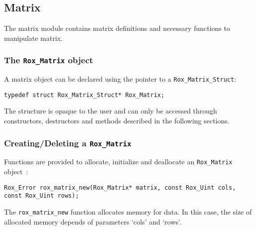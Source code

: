 \subsection{Matrix}
\label{sse:matrix}

The matrix module contains matrix definitions and necessary functions to manipulate matrix.

\subsubsection{The {\tt Rox\_Matrix} object}
\label{sss:matrix_object}

A matrix object can be declared using the pointer to a \lstinline$Rox_Matrix_Struct$: 

\begin{lstlisting}
typedef struct Rox_Matrix_Struct* Rox_Matrix;
\end{lstlisting}

The structure is opaque to the user and can only be accessed through constructors, destructors and methods described in the following sections.

\subsubsection{Creating/Deleting a {\tt Rox\_Matrix}}
\label{sss:creating-deleting_matrix}
Functions are provided to allocate, initialize and deallocate an \lstinline$Rox_Matrix$ object~:
\begin{lstlisting}
Rox_Error rox_matrix_new(Rox_Matrix* matrix, const Rox_Uint cols, const Rox_Uint rows);
\end{lstlisting}
The \lstinline$rox_matrix_new$ function allocates memory for data. 
In this case, the size of allocated memory depends of parameters `cols' and `rows'.\\ 



